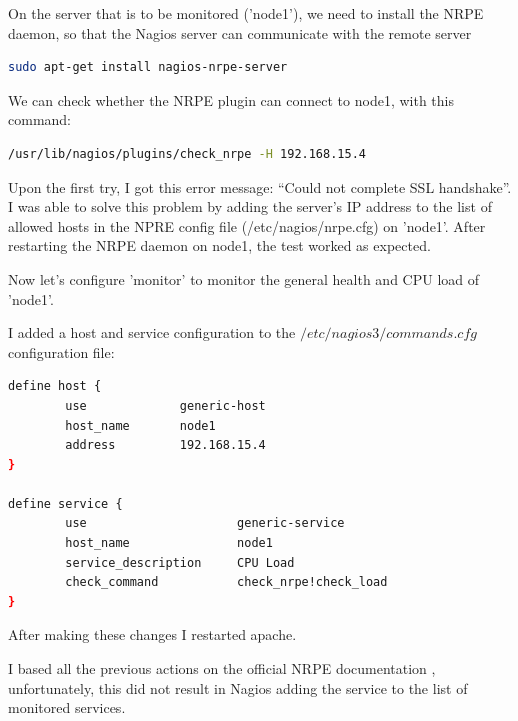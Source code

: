 \documentclass[12pt]{report}
\begin{document}
On the server that is to be monitored ('node1'), we need to install the NRPE
daemon, so that the Nagios server can communicate with the remote
server
\begin{lstlisting}[language=bash]
  sudo apt-get install nagios-nrpe-server
\end{lstlisting} 

We can check whether the NRPE plugin can connect to node1, with this command:
\begin{lstlisting}[language=bash]
  /usr/lib/nagios/plugins/check_nrpe -H 192.168.15.4
\end{lstlisting} 
Upon the first try, I got this error message: ``Could not complete SSL
handshake''.
I was able to solve this problem by adding the server's IP address to
the list of allowed hosts in the NPRE config file
(/etc/nagios/nrpe.cfg) on 'node1'.
After restarting the NRPE daemon on node1, the test worked as
expected.

Now let's configure 'monitor' to monitor the general health and CPU load of  'node1'.

I added a host and service configuration to the
$/etc/nagios3/commands.cfg$ configuration file:
\begin{lstlisting}[language=bash]
define host {
        use             generic-host
        host_name       node1
        address         192.168.15.4
}

define service {
        use                     generic-service
        host_name               node1
        service_description     CPU Load
        check_command           check_nrpe!check_load
}
\end{lstlisting}
After making these changes I restarted apache.

I based all the previous actions on the official NRPE documentation
\cite{nrpe_doc}, unfortunately, this did not result in Nagios adding
the service to the list of monitored services.
\end{document}
